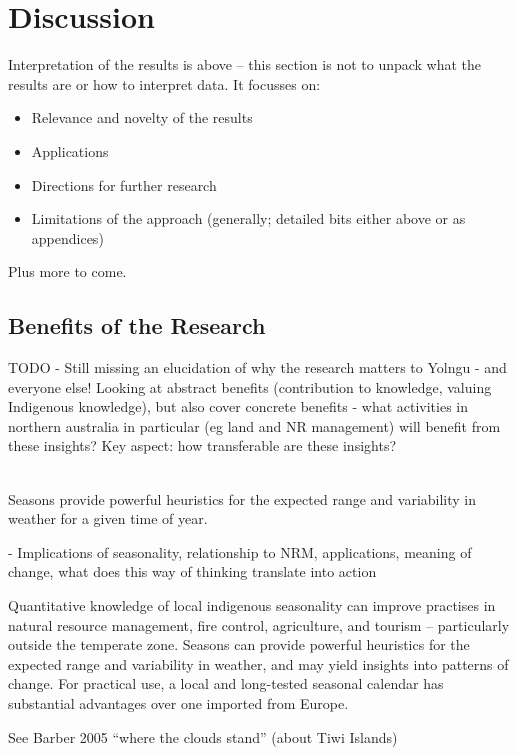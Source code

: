 \chapter{Discussion}

Interpretation of the results is above – this section is not to unpack what the results are or how to interpret data.  It focusses on:
\begin{itemize}
\item Relevance and novelty of the results
\item Applications
\item Directions for further research
\item Limitations of the approach (generally; detailed bits either above or as appendices)
\end{itemize}
Plus more to come.





\section{Benefits of the Research}
TODO - Still missing an elucidation of why the research matters to Yolngu -
and everyone else!
Looking at abstract benefits (contribution to knowledge, valuing Indigenous knowledge),
but also cover concrete benefits - what activities in northern australia
in particular (eg land and NR management) will benefit from these insights?
Key aspect: how transferable are these insights?

~\\

Seasons provide powerful heuristics for the expected range and variability in 
weather for a given time of year.

-	Implications of seasonality, relationship to NRM, applications, meaning of 
change, what does this way of thinking translate into action


Quantitative knowledge of local indigenous seasonality can improve practises in 
natural resource management, fire control, agriculture, and tourism – 
particularly outside the temperate zone.  Seasons can provide powerful 
heuristics for the expected range and variability in weather, and may yield 
insights into patterns of change.  For practical use, a local and long-tested 
seasonal calendar has substantial advantages over one imported from Europe.


See Barber 2005 ``where the clouds stand'' (about Tiwi Islands)

